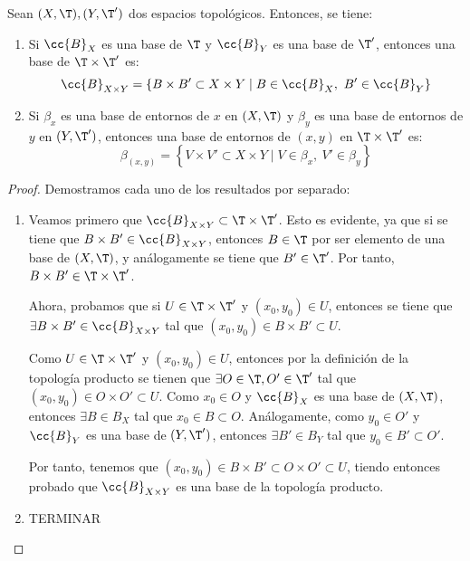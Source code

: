 \begin{prop}
    Sean $(X,\T), (Y,\T')$ dos espacios topológicos. Entonces, se tiene:
    \begin{enumerate}
        \item Si $\cc{B}_X$ es una base de $\T$ y $\cc{B}_Y$ es una base de $\T'$, entonces una base de $\T\times \T'$ es:
        \begin{equation*}
            \cc{B}_{X\times Y}=\left\{B\times B'\subset X\times Y\mid B\in \cc{B}_X,~B'\in \cc{B}_Y\right\}
        \end{equation*}

        \item Si $\beta_x$ es una base de entornos de $x$ en $(X,\T)$ y $\beta_y$ es una base de entornos de $y$ en $(Y,\T')$, entonces una base de entornos de $(x,y)$ en $\T\times \T'$ es:
        \begin{equation*}
            \beta_{(x,y)}=\left\{V\times V'\subset X\times Y\mid V\in \beta_x,~V'\in \beta_y\right\}
        \end{equation*}
    \end{enumerate}
\end{prop}
\begin{proof}
    Demostramos cada uno de los resultados por separado:
    \begin{enumerate}
        \item Veamos primero que $\cc{B}_{X\times Y}\subset \T\times \T'$. Esto es evidente, ya que si se tiene que $B\times B'\in\cc{B}_{X\times Y}$, entonces $B\in \T$ por ser elemento de una base de $(X,\T)$, y análogamente se tiene que $B'\in \T'$. Por tanto, $B\times B'\in \T\times \T'$.

        Ahora, probamos que si $U\in \T\times \T'$ y $(x_0,y_0)\in U$, entonces se tiene que $\exists B\times B'\in \cc{B}_{X\times Y}$ tal que $(x_0,y_0)\in B\times B'\subset U$.

        Como $U\in \T\times \T'$ y $(x_0,y_0)\in U$, entonces por la definición de la topología producto se tienen que $\exists O\in \T,O'\in \T'$ tal que $(x_0,y_0)\in O\times O'\subset U$. Como $x_0\in O$ y $\cc{B}_X$ es una base de $(X,\T)$, entonces $\exists B\in B_X$ tal que $x_0\in B\subset O$. Análogamente, como $y_0\in O'$ y $\cc{B}_Y$ es una base de $(Y,\T')$, entonces $\exists B'\in B_Y$ tal que $y_0\in B'\subset O'$.
        
        Por tanto, tenemos que $(x_0,y_0)\in B\times B'\subset O\times O'\subset U$, tiendo entonces probado que $\cc{B}_{X\times Y}$ es una base de la topología producto.

        \item TERMINAR %
    \end{enumerate}
\end{proof}
